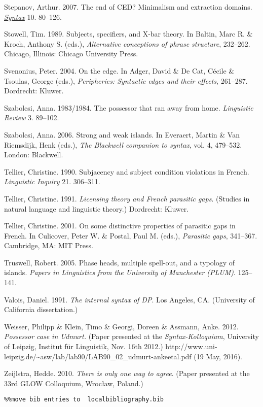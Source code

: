 \documentclass[output=paper]{langsci/langscibook}
\begin{document}
Stepanov, Arthur. 2007. The end of CED? Minimalism and extraction domains. \href{https://www.researchgate.net/journal/1467-9612_Syntax}{\textit{Syntax}} 10. 80–126.

Stowell, Tim. 1989. Subjects, specifiers, and X-bar theory. In Baltin, Marc R. \& Kroch, Anthony S. (eds.), \textit{Alternative conceptions of phrase structure}, 232–262. Chicago, Illinois: Chicago University Press.

Svenonius, Peter. 2004. On the edge. In Adger, David \& De Cat, Cécile \& Tsoulas, George (eds.), \textit{Peripheries: Syntactic edges and their effects}, 261–287. Dordrecht: Kluwer.

Szabolcsi, Anna. 1983/1984. The possessor that ran away from home. \textit{Linguistic Review} 3. 89–102.

Szabolcsi, Anna. 2006. Strong and weak islands. In Everaert, Martin \& Van Riemsdijk, Henk (eds.), \textit{The Blackwell companion to syntax}, vol. 4, 479–532. London: Blackwell.

Tellier, Christine. 1990. Subjacency and subject condition violations in French. \textit{Linguistic Inquiry} 21. 306–311.

Tellier, Christine. 1991. \textit{Licensing theory and French parasitic gaps}. (Studies in natural language and linguistic theory.) Dordrecht: Kluwer.

Tellier, Christine. 2001. On some distinctive properties of parasitic gaps in French. In Culicover, Peter W. \& Postal, Paul M. (eds.), \textit{Parasitic gaps}, 341–367. Cambridge, MA: MIT Press.

Truswell, Robert. 2005. Phase heads, multiple spell-out, and a typology of islands. \textit{Papers in Linguistics from the University of Manchester (PLUM)}. 125–141.

Valois, Daniel. 1991. \textit{The internal syntax of DP}. Los Angeles, CA. (University of California dissertation.)

Weisser, Philipp \& Klein, Timo \& Georgi, Doreen \& Assmann, Anke. 2012. \textit{Possessor case in Udmurt.} (Paper presented at the \textit{Syntax-Kolloquium}, University of Leipzig, Institut für Linguistik, Nov. 16th 2012.) http://www.uni-leipzig.de/{\textasciitilde}asw/lab/lab90/LAB90\_02\_udmurt-ankeetal.pdf (19 May, 2016).

Zeijlstra, Hedde. 2010. \textit{There is only one way to agree}. (Paper presented at the 33rd GLOW Colloquium, Wrocław, Poland.)


\begin{verbatim}%%move bib entries to  localbibliography.bib
\end{verbatim} 

\sloppy
\printbibliography[heading=subbibliography,notkeyword=this] 
\end{document}
